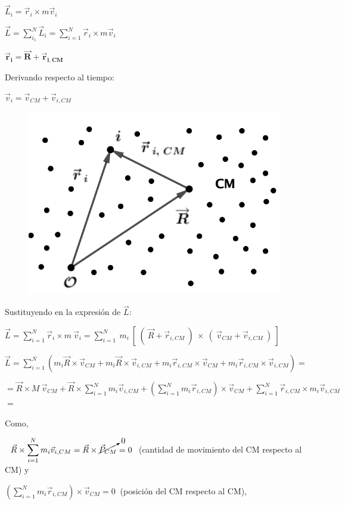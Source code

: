 \begin{multicols}{2}
$\vec L_i=\vec r_i \times m\vec v_i$

$\vec L =\displaystyle \sum_{i_1}^N \vec L_i  = \sum_{i=1}^N\vec r_i \times m\vec v_i$

$\boldsymbol{\vec r_i=\overrightarrow R + \vec r_{i,CM}}$

Derivando respecto al tiempo:

$\vec v_i=\vec v_{CM}+\vec v_{i,CM}$
\begin{figure}[H]
	\centering
	\includegraphics[width=.5\textwidth]{imagenes/imagenes12/T12IM03.png}
\end{figure}
\end{multicols}

Sustituyendo en la expresión de $\vec L$:

$\vec L =\displaystyle \sum_{i=1}^N\vec r_i \times m \ \vec v_i =
\sum_{i=1}^N \  m_i\ \left[ \ ( \ \vec R +\vec r_{i,CM} \ ) \ \times \ ( \ \vec v_{CM}+\vec v_{i,CM} \ ) \ \right]$

$\vec L = \displaystyle \sum_{i=1}^N \left( 
m_i \vec R \times \vec v_{CM}+m_i \vec R \times \vec v_{i,CM}+m_i \vec r_{i,CM} \times \vec v_{CM}  +m_i \vec r_{i,CM} \times  \vec v_{i,CM}
\right)=$

\small{$\displaystyle =
\vec R \times M\  \vec v_{CM}+\vec R \times \sum_{i=1}^N m_i \vec v_{i,CM}+   \left( \sum_{i=1}^N  m_i \vec r_{i,CM} \right) \times \vec v_{CM}  +  \sum_{i=1}^N   \vec r_{i,CM} \times m_i \vec v_{i,CM}
$}\normalsize{$=$}

Como, 

\hspace{7mm} $\  \ \displaystyle \vec R \times \sum_{i=1}^N m_i \vec v_{i,CM}=\vec R \times \cancelto{0}{\vec P_{CM}}=0 \ $ (cantidad de movimiento del CM respecto al CM) y
  
\hspace{7mm} $\displaystyle  \left( \sum_{i=1}^N  m_i \vec r_{i,CM} \right) \times \vec v_{CM} =0\ $ (posición del CM respecto al CM), 

